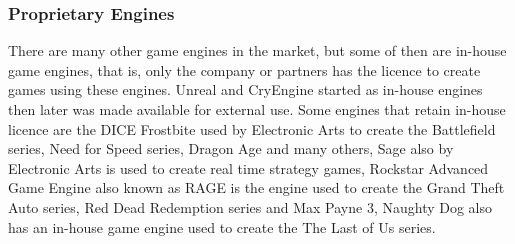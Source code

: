 \subsubsection{Proprietary Engines}
There are many other game engines in the market, but some of then are in-house game engines, that is, only the company or partners has the licence to create games using these engines. Unreal and CryEngine started as in-house engines then later was made available for external use\cite{GameEngineArchitecture}. Some engines that retain in-house licence are the DICE Frostbite used by Electronic Arts to create the Battlefield series, Need for Speed series, Dragon Age and many others, Sage also by Electronic Arts is used to create real time strategy games, Rockstar Advanced Game Engine also known as RAGE is the engine used to create the Grand Theft Auto series, Red Dead Redemption series and Max Payne 3, Naughty Dog also has an in-house game engine used to create the The Last of Us series\cite{GameEngineArchitecture}.